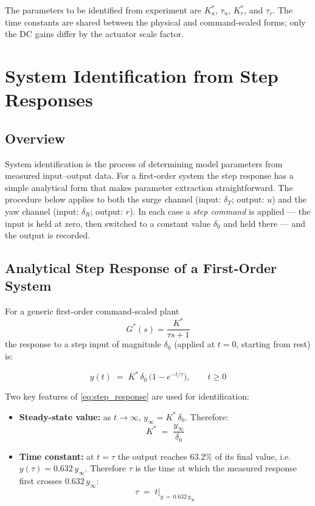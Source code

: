 \documentclass[11pt]{article}
\begin{document}
The parameters to be identified from experiment are $K_u^*$, $\tau_u$,
$K_r^*$, and $\tau_r$.  The time constants are shared between the physical
and command-scaled forms; only the DC gains differ by the actuator scale
factor.

\section{System Identification from Step Responses}
\label{sec:sysid}

\subsection{Overview}

System identification is the process of determining model parameters from
measured input--output data.  For a first-order system the step response
has a simple analytical form that makes parameter extraction
straightforward.  The procedure below applies to both the surge channel
(input: $\delta_T$; output: $u$) and the yaw channel (input: $\delta_R$;
output: $r$).  In each case a \emph{step command} is applied --- the input
is held at zero, then switched to a constant value $\delta_0$ and held
there --- and the output is recorded.

\subsection{Analytical Step Response of a First-Order System}

For a generic first-order command-scaled plant
\[
  G^*(s) = \frac{K^*}{\tau s + 1}
\]
the response to a step input of magnitude $\delta_0$ (applied at $t=0$,
starting from rest) is:

\begin{equation}
  y(t) \;=\; K^*\,\delta_0\,\bigl(1 - e^{-t/\tau}\bigr), \qquad t \geq 0
  \label{eq:step_response}
\end{equation}

Two key features of \eqref{eq:step_response} are used for identification:

\begin{itemize}
  \item \textbf{Steady-state value:} as $t \to \infty$,
        $y_\infty = K^*\,\delta_0$.  Therefore:
        \begin{equation}
          K^* \;=\; \frac{y_\infty}{\delta_0}
          \label{eq:K_id}
        \end{equation}

  \item \textbf{Time constant:} at $t = \tau$ the output reaches
        $63.2\%$ of its final value, i.e.\ $y(\tau) = 0.632\,y_\infty$.
        Therefore $\tau$ is the time at which the measured response first
        crosses $0.632\,y_\infty$:
        \begin{equation}
          \tau \;=\; t\big|_{y\,=\,0.632\,y_\infty}
          \label{eq:tau_id}
        \end{equation}
\end{itemize}
\end{document}
